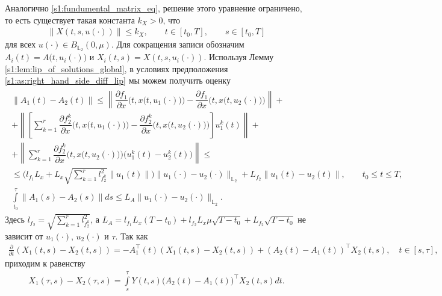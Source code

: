 \documentclass[../main.tex]{subfiles}
\begin{document}
Аналогично \eqref{s1:fundumental_matrix_eq}, решение этого уравнение ограничено, то есть существует такая константа $k_X>0$, что
\begin{gather*}
 \| X(t,s, u(\cdot)) \| \leqslant k_X, \qquad t \in [t_0,T], \qquad s \in [t_0,T]
\end{gather*}
для всех $u(\cdot) \in B_{\mathbb{L}_2}(0,\mu)$. 
Для сокращения записи обозначим $A_i(t) = A\big(t, u_i(\cdot)\big) $ и $ X_i(t,s) = X(t, s, u_i(\cdot))$. 
Используя Лемму \ref{s1:lem:lip_of_solutions_global}, в условиях предположения \ref{s1:as:right_hand_side_diff_lip} мы можем получить оценку
\begin{gather}\label{s1:lip_a}
\begin{gathered}
 \| A_1(t) - A_2(t) \| \leqslant 
 \left\| 
 \dfrac{\partial f_1}{\partial x} \Big(t,x\big(t,u_1(\cdot)\big)\Big) 
 - 
 \dfrac{\partial f_1}{\partial x} \Big(t,x\big(t,u_2(\cdot)\big)\Big) 
 \right\| 
 + \\ +
 \left\| 
 \left[ 
 \sum\limits_{k=1}^r 
 \dfrac{\partial f_2^k}{\partial x}\Big(t,x\big(t,u_1(\cdot)\big)\Big) 
 - 
 \dfrac{\partial f_2^k}{\partial x}\Big(t,x\big(t,u_2(\cdot)\big)\Big)
 \right] 
 u_1^k(t) 
 \right\| 
 + \\ +
 \left\| 
 \sum\limits_{k=1}^r 
 \dfrac{\partial f_2^k}{\partial x}\Big(t,x\big(t,u_2(\cdot)\big)\Big)
 \Big(u_1^k(t) - u_2^k(t)\Big) 
 \right\| 
 \leqslant \\ \leqslant
 \Big(l_{f_1} L_x + L_x \sqrt{\sum\limits_{k=1}^r l_{f_2^k}^2} \|u_1(t) \|\Big) \| u_1(\cdot) - u_2(\cdot) \|_{\mathbb{L}_2} + L_{f_2} \| u_1(t) - u_2(t) \|, \qquad t_0 \leqslant t \leqslant T,\\
 \int\limits_{t_0}^{\tau} \|A_1(s) - A_2(s) \| ds \leqslant L_A \| u_1(\cdot) - u_2(\cdot) \|_{\mathbb{L}_2}. 
\end{gathered}
\end{gather}
Здесь $l_{f_2} = \sqrt{\sum\limits_{k=1}^r l_{f_2^k}^2}$, а $L_A = l_{f_1} L_x (T - t_0) + l_{f_2} L_x \mu \sqrt{T - t_0} + L_{f_2} \sqrt{T - t_0}$ не зависит от $u_1(\cdot)$, $u_2(\cdot)$ и $\tau$.
Так как
\begin{gather*}
 \frac{\partial}{\partial t} \left(X_1(t,s) - X_2(t,s) \right) = -A_1^{\top}(t) \left(X_1(t,s) - X_2(t,s) \right) + (A_2(t) - A_1(t))^{\top} X_2(t,s), \quad t \in [s,\tau], 
\end{gather*}
приходим к равенству
\begin{gather*}
 X_1(\tau,s) - X_2(\tau,s) = \int\limits_s^{\tau} Y(t,s) \big(A_2(t) - A_1(t)\big)^{\top} X_2(t,s) dt.
\end{gather*}
\end{document}
